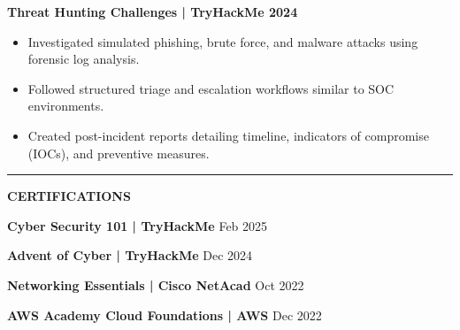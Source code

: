 \documentclass[11pt,a4paper]{article}
\newcommand{\resumesection}[1]{
	\vspace{0.2cm}
	\hrule
	\vspace{0.2cm}
	\centerline{\large\textbf{#1}}
	\vspace{0.15cm}
}
\begin{document}
	\vspace{0.1cm}
	\noindent \textbf{Threat Hunting Challenges | TryHackMe \hfill 2024}
	\begin{itemize}
		\item Investigated simulated phishing, brute force, and malware attacks using forensic log analysis.
		\item Followed structured triage and escalation workflows similar to SOC environments.
		\item Created post-incident reports detailing timeline, indicators of compromise (IOCs), and preventive measures.
	\end{itemize}
	
	
	\resumesection{CERTIFICATIONS}
	\noindent \textbf{Cyber Security 101 | TryHackMe} \hfill Feb 2025

	
	\noindent \textbf{Advent of Cyber | TryHackMe} \hfill Dec 2024

	
	\noindent \textbf{Networking Essentials | Cisco NetAcad} \hfill Oct 2022

	
	\noindent \textbf{AWS Academy Cloud Foundations | AWS} \hfill Dec 2022
	
\end{document}
